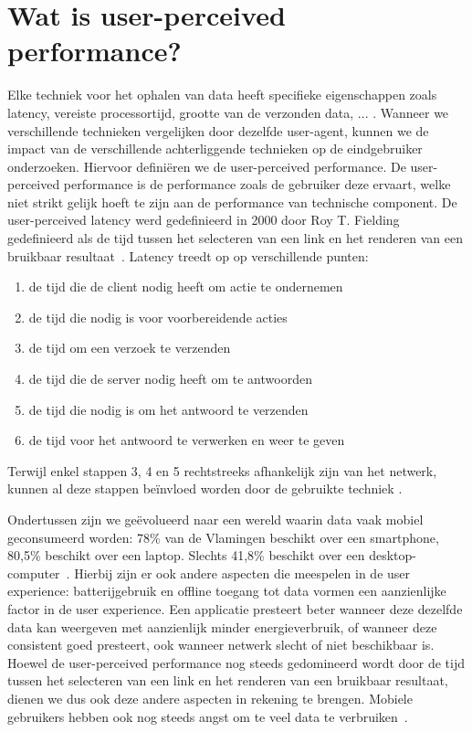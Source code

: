 \section{Wat is user-perceived performance?}
\label{sec:what_is_user_perceived_performance}
Elke techniek voor het ophalen van data heeft specifieke eigenschappen zoals latency, vereiste processortijd, grootte van de verzonden data, ... . Wanneer we verschillende technieken vergelijken door dezelfde user-agent, kunnen we de impact van de verschillende achterliggende technieken op de eindgebruiker onderzoeken. Hiervoor definiëren we de user-perceived performance. De user-perceived performance is de performance zoals de gebruiker deze ervaart, welke niet strikt gelijk hoeft te zijn aan de performance van technische component. De user-perceived latency werd gedefinieerd in 2000 door Roy T. Fielding gedefinieerd als de tijd tussen het selecteren van een link en het renderen van een bruikbaar resultaat~\citep{fielding99}. Latency treedt op op verschillende punten: 
\begin{enumerate}
	\item de tijd die de client nodig heeft om actie te ondernemen 
	\item de tijd die nodig is voor voorbereidende acties
	\item de tijd om een verzoek te verzenden
	\item de tijd die de server nodig heeft om te antwoorden
	\item de tijd die nodig is om het antwoord te verzenden
	\item de tijd voor het antwoord te verwerken en weer te geven
\end{enumerate}
Terwijl enkel stappen 3, 4 en 5 rechtstreeks afhankelijk zijn van het netwerk, kunnen al deze stappen beïnvloed worden door de gebruikte techniek \citep{fielding99}.

Ondertussen zijn we geëvolueerd naar een wereld waarin data vaak mobiel geconsumeerd worden: 78\% van de Vlamingen beschikt over een smartphone, 80,5\% beschikt over een laptop. Slechts 41,8\% beschikt over een desktop-computer~\citep{digimeter17}. Hierbij zijn er ook andere aspecten die meespelen in de user experience: batterijgebruik en offline toegang tot data vormen een aanzienlijke factor in de user experience. Een applicatie presteert beter wanneer deze dezelfde data kan weergeven met aanzienlijk minder energieverbruik, of wanneer deze consistent goed presteert, ook wanneer netwerk slecht of niet beschikbaar is. Hoewel de user-perceived performance nog steeds gedomineerd wordt door de tijd tussen het selecteren van een link en het renderen van een bruikbaar resultaat, dienen we dus ook deze andere aspecten in rekening te brengen. Mobiele gebruikers hebben ook nog steeds angst om te veel data te verbruiken~\citep{ammelrooy17}.

